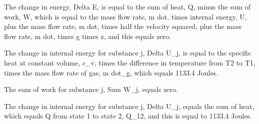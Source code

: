 The change in energy, Delta E, is equal to the sum of heat, Q, minus the sum of work, W, which is equal to the mass flow rate, m dot, times internal energy, U, plus the mass flow rate, m dot, times half the velocity squared, plus the mass flow rate, m dot, times g times z, and this equals zero.

The change in internal energy for substance j, Delta U_j, is equal to the specific heat at constant volume, c_v, times the difference in temperature from T2 to T1, times the mass flow rate of gas, m dot_g, which equals 1133.4 Joules.

The sum of work for substance j, Sum W_j, equals zero.

The change in internal energy for substance j, Delta U_j, equals the sum of heat, which equals Q from state 1 to state 2, Q_12, and this is equal to 1133.4 Joules.
